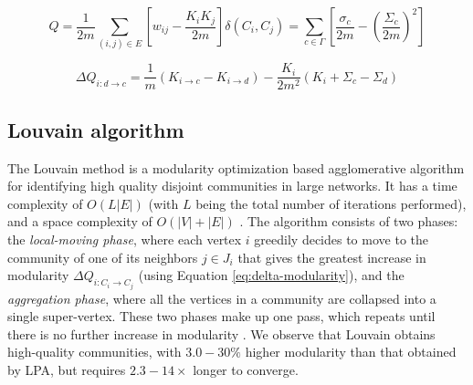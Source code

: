 \begin{equation}
\label{eq:modularity}
  Q
  = \frac{1}{2m} \sum_{(i, j) \in E} \left[w_{ij} - \frac{K_i K_j}{2m}\right] \delta(C_i, C_j)
  = \sum_{c \in \Gamma} \left[\frac{\sigma_c}{2m} - \left(\frac{\Sigma_c}{2m}\right)^2\right]
\end{equation}

\begin{equation}
\label{eq:delta-modularity}
  \Delta Q_{i: d \rightarrow c}
  = \frac{1}{m} (K_{i \rightarrow c} - K_{i \rightarrow d}) - \frac{K_i}{2m^2} (K_i + \Sigma_c - \Sigma_d)
\end{equation}




\subsection{Louvain algorithm}
\label{sec:about-louvain}

The Louvain method \cite{com-blondel08} is a modularity optimization based agglomerative algorithm for identifying high quality disjoint communities in large networks. It has a time complexity of $O (L |E|)$ (with $L$ being the total number of iterations performed), and a space complexity of $O(|V| + |E|)$ \cite{com-lancichinetti09}. The algorithm consists of two phases: the \textit{local-moving phase}, where each vertex $i$ greedily decides to move to the community of one of its neighbors $j \in J_i$ that gives the greatest increase in modularity $\Delta Q_{i:C_i \rightarrow C_j}$ (using Equation \ref{eq:delta-modularity}), and the \textit{aggregation phase}, where all the vertices in a community are collapsed into a single super-vertex. These two phases make up one pass, which repeats until there is no further increase in modularity \cite{com-blondel08, com-leskovec21}. We observe that Louvain obtains high-quality communities, with $3.0 - 30\%$ higher modularity than that obtained by LPA, but requires $2.3 - 14\times$ longer to converge.
